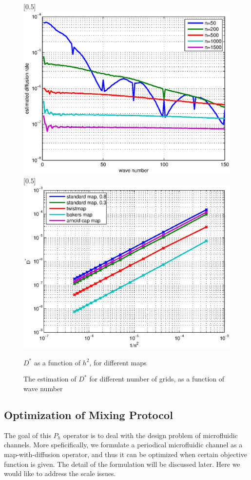 \documentclass{article}
\begin{document}
\begin{figure}
\centerline{\scalebox{0.5}[0.5]{\includegraphics{estimateddiffusionrate.eps}}
            \scalebox{0.5}[0.5]{\includegraphics{ndchart.eps}}}
\caption{\label{ndchart} $D^*$ as a function of $h^2$, for
different maps } \caption{\label{estimateddiffusionrate} The
estimation of $D^*$ for different number of grids, as a function of
wave number}
\end{figure}

\subsection{Optimization of Mixing Protocol}
The goal of this $P_h$ operator is to deal with the design problem of microfluidic channels.
More speficifically, we formulate a periodical microfluidic channel as a map-with-diffusion
operator, and thus it can be optimized when certain objective function is given. The detail
of the formulation will be discussed later. Here we would like to address the scale issues.
\end{document}
